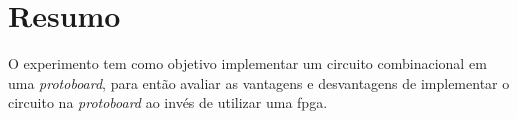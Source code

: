 \chapter{Resumo}
	O experimento tem como objetivo implementar um circuito combinacional em uma \textit{protoboard},
	para então avaliar as vantagens e desvantagens de implementar o circuito na \textit{protoboard}
	ao invés de utilizar uma \ac{fpga}.

